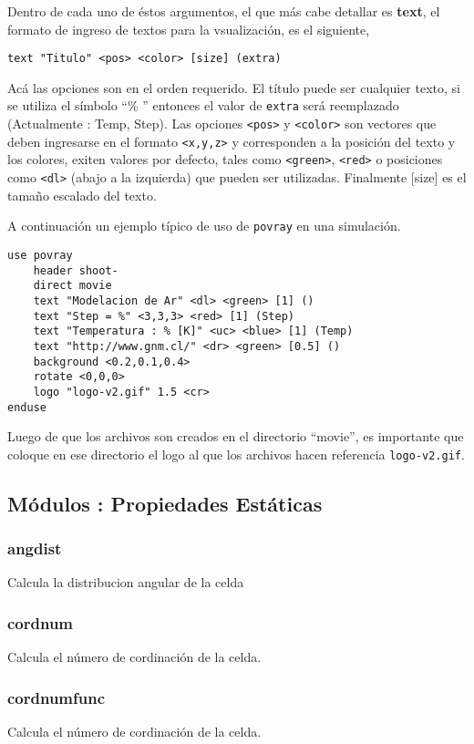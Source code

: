 \documentclass[a4paper,10pt]{scrbook}
\newcommand{\control}[1]{\begin{center}\begin{minipage}{10cm}\texttt{#1}\end{minipage}\end{center}}
\begin{document}
Dentro de cada uno de \'estos argumentos, el que m\'as cabe detallar es \textbf{text}, el formato de ingreso de textos para la vsualizaci\'on, es el siguiente,

\control{text "Titulo" <pos> <color> [size] (extra)}

Ac\'a las opciones son en el orden requerido. El t\'itulo puede ser cualquier texto, si se utiliza el s\'imbolo ``\% '' entonces el valor de \verb|extra| ser\'a reemplazado (Actualmente : Temp, Step). Las opciones \verb|<pos>| y \verb|<color>| son vectores que deben ingresarse en el formato \verb|<x,y,z>| y corresponden a la posici\'on del texto y los colores, exiten valores por defecto, tales como \verb|<green>|, \verb|<red>| o posiciones como \verb|<dl>| (abajo a la izquierda) que pueden ser utilizadas. Finalmente [size] es el tama\~no escalado del texto.

A continuaci\'on un ejemplo t\'ipico de uso de \verb|povray| en una simulaci\'on.

\begin{verbatim}
use povray
    header shoot-
    direct movie
    text "Modelacion de Ar" <dl> <green> [1] ()
    text "Step = %" <3,3,3> <red> [1] (Step)
    text "Temperatura : % [K]" <uc> <blue> [1] (Temp)
    text "http://www.gnm.cl/" <dr> <green> [0.5] ()
    background <0.2,0.1,0.4>
    rotate <0,0,0>
    logo "logo-v2.gif" 1.5 <cr>
enduse
\end{verbatim}

Luego de que los archivos son creados en el directorio ``movie'', es importante que coloque en ese directorio el logo al que los archivos hacen referencia \verb|logo-v2.gif|.

\subsection{M\'odulos : Propiedades Est\'aticas}
\subsubsection{angdist}
Calcula la distribucion angular de la celda
\subsubsection{cordnum}
Calcula el n\'umero de cordinaci\'on de la celda.
\subsubsection{cordnumfunc}
Calcula el n\'umero de cordinaci\'on de la celda.
\end{document}
